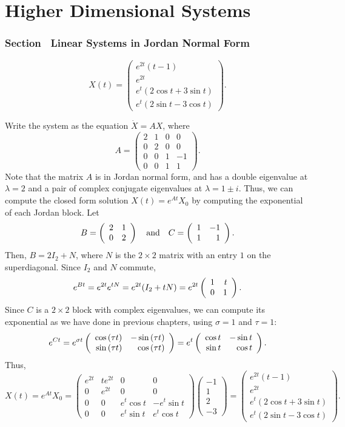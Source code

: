 \chapter{Higher Dimensional Systems}

\subsection*{Section~\protect{\ref{sec:LinHomSys}} Linear Systems in Jordan
Normal Form}

 \ans 
\[
X(t) =
\left(\begin{array}{c}
e^{2t}(t - 1) \\
e^{2t} \\
e^t(2\cos{t} + 3\sin{t}) \\
e^t(2\sin{t} - 3\cos{t})
\end{array}\right).
\]

\soln Write the system as the equation $\dot{X} = AX$, where
\[
A =
\left(\begin{array}{rrrr}
2 & 1 & 0 & 0 \\
0 & 2 & 0 & 0 \\
0 & 0 & 1 & -1 \\
0 & 0 & 1 & 1
\end{array}\right).
\]
Note that the matrix $A$ is in Jordan normal form, and has a double
eigenvalue at $\lambda = 2$ and a pair of complex conjugate eigenvalues
at $\lambda = 1 \pm i$.  Thus, we can compute the closed form solution
$X(t) = e^{At}X_0$ by computing the exponential of each Jordan block.  Let
\[
B = \left(\begin{array}{rr} 2 & 1\\ 0 &2\end{array}\right) \quad\mbox{and}\quad C = \left(\begin{array}{rr} 1 & -1\\ 1 &1\end{array}\right).
\]
Then, $B = 2I_2 + N$, where $N$ is the $2 \times 2$ matrix with an entry $1$
on the superdiagonal.  Since $I_2$ and $N$ commute,
\[
e^{Bt} = e^{2t}e^{tN} = e^{2t}(I_2 + tN) =
e^{2t}\left(\begin{array}{rr} 1 & t\\ 0 &1\end{array}\right).
\]
Since $C$ is a $2 \times 2$ block with complex eigenvalues, we can
compute its exponential as we have done in previous chapters, using
$\sigma = 1$ and $\tau = 1$:
\[
e^{Ct} = e^{\sigma t}\left(\begin{array}{rr} \cos{(\tau t)} & -\sin{(\tau t)}\\ \sin{(\tau t)} &\cos{(\tau t)}\end{array}\right)
= e^{t}\left(\begin{array}{rr} \cos{t} & -\sin{t}\\ \sin{t} &\cos{t}\end{array}\right).
\]
Thus,
\[
X(t) = e^{At}X_0 =
\left(\begin{array}{cccc}
e^{2t} & te^{2t} & 0 & 0 \\
0 & e^{2t} & 0 & 0 \\
0 & 0 & e^t\cos{t} & -e^t\sin{t} \\
0 & 0 & e^t\sin{t} & e^t\cos{t}
\end{array}\right)
\left(\begin{array}{r} -1 \\ 1 \\ 2 \\ -3 \end{array}\right)
= \left(\begin{array}{c}
e^{2t}(t - 1) \\
e^{2t} \\
e^t(2\cos{t} + 3\sin{t}) \\
e^t(2\sin{t} - 3\cos{t})
\end{array}\right).
\]

